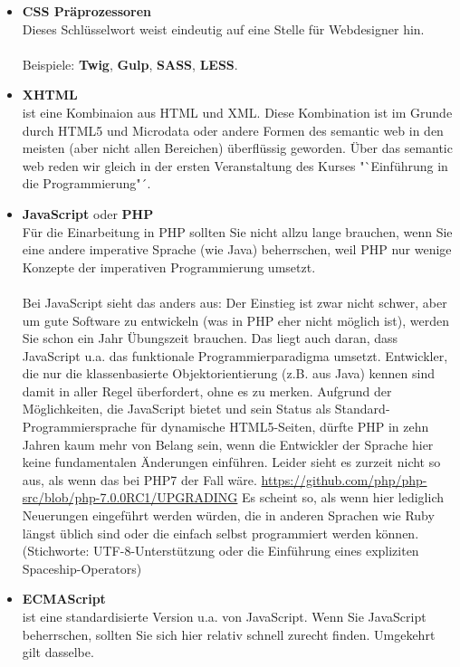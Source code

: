 \begin{itemize}
	\item \textbf{CSS Präprozessoren}\\
	Dieses Schlüsselwort weist eindeutig auf eine Stelle für Webdesigner hin.\\
	\\
	Beispiele: \textbf{Twig}, \textbf{Gulp}, \textbf{SASS}, \textbf{LESS}.
	
	\item \textbf{XHTML}\\
	ist eine Kombinaion aus HTML und XML. Diese Kombination ist im Grunde durch HTML5 und Microdata oder andere Formen des semantic web in den meisten (aber nicht allen Bereichen) überflüssig geworden. Über das semantic web reden wir gleich in der ersten Veranstaltung des Kurses "`Einführung in die Programmierung"´.
	
	\item \textbf{JavaScript} oder \textbf{PHP}\\
	Für die Einarbeitung in PHP sollten Sie nicht allzu lange brauchen, wenn Sie eine andere imperative Sprache (wie Java) beherrschen, weil PHP nur wenige Konzepte der imperativen Programmierung umsetzt. \\
	\\
	Bei JavaScript sieht das anders aus: Der Einstieg ist zwar nicht schwer, aber um gute Software zu entwickeln (was in PHP eher nicht möglich ist), werden Sie schon ein Jahr Übungszeit brauchen. Das liegt auch daran, dass JavaScript u.a. das funktionale  Programmierparadigma umsetzt. Entwickler, die nur die klassenbasierte Objektorientierung (z.B. aus Java) kennen sind damit in aller Regel überfordert, ohne es zu merken. Aufgrund der Möglichkeiten, die JavaScript bietet und sein Status als Standard-Programmiersprache für dynamische HTML5-Seiten, dürfte PHP in zehn Jahren kaum mehr von Belang sein, wenn die Entwickler der Sprache hier keine fundamentalen Änderungen einführen. Leider sieht es zurzeit nicht so aus, als wenn das bei PHP7 der Fall wäre. \url{https://github.com/php/php-src/blob/php-7.0.0RC1/UPGRADING} Es scheint so, als wenn hier lediglich Neuerungen eingeführt werden würden, die in anderen Sprachen wie Ruby längst üblich sind oder die einfach selbst programmiert werden können. (Stichworte: UTF-8-Unterstützung oder die Einführung eines expliziten Spaceship-Operators)

	\item \textbf{ECMAScript}\\
	ist eine standardisierte Version u.a. von JavaScript. Wenn Sie JavaScript beherrschen, sollten Sie sich hier relativ schnell zurecht finden. Umgekehrt gilt dasselbe.
	

\end{itemize}
